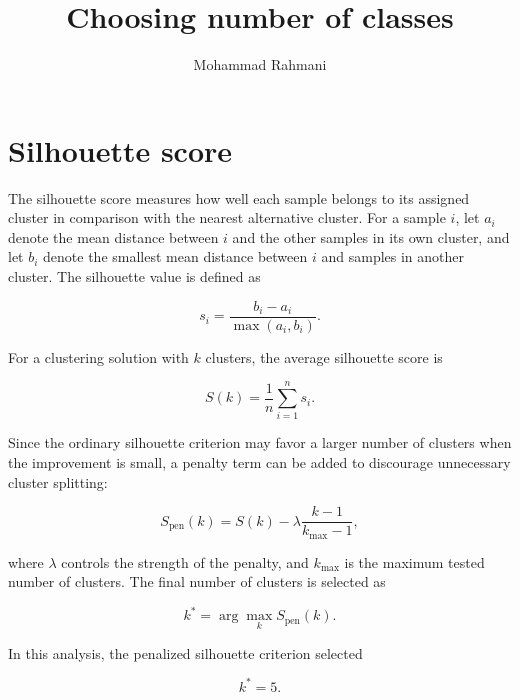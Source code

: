 \documentclass[a4paper]{article}
\title{Choosing number of classes}
\date{}
\author{Mohammad Rahmani}
\begin{document}
    \maketitle
    
    
    \section{Silhouette score}
        The silhouette score \cite{rousseeuw-1987-silhouettes-a-graphical-aid-to-the-interpretation-and-validation-of-cluster-analysis} measures how well each sample belongs to its assigned cluster in comparison with the nearest alternative cluster. For a sample \(i\), let \(a_i\) denote the mean distance between \(i\) and the other samples in its own cluster, and let \(b_i\) denote the smallest mean distance between \(i\) and samples in another cluster. The silhouette value is defined as
        
        \[
            s_i
            =
            \frac{b_i - a_i}{\max(a_i, b_i)}.
        \]
        
        For a clustering solution with \(k\) clusters, the average silhouette score is
        
        \[
            S(k)
            =
            \frac{1}{n}
            \sum_{i=1}^{n}
            s_i.
        \]
        
        Since the ordinary silhouette criterion may favor a larger number of clusters when the improvement is small, a penalty term can be added to discourage unnecessary cluster splitting:
        
        \[
            S_{\mathrm{pen}}(k)
            =
            S(k)
            -
            \lambda
            \frac{k - 1}{k_{\max} - 1},
        \]
        
        where \(\lambda\) controls the strength of the penalty, and \(k_{\max}\) is the maximum tested number of clusters. The final number of clusters is selected as
        
        \[
            k^{\ast}
            =
            \arg\max_{k}
            S_{\mathrm{pen}}(k).
        \]
        
        In this analysis, the penalized silhouette criterion selected
        
        \[
            k^{\ast} = 5.
        \]
        
\end{document}
